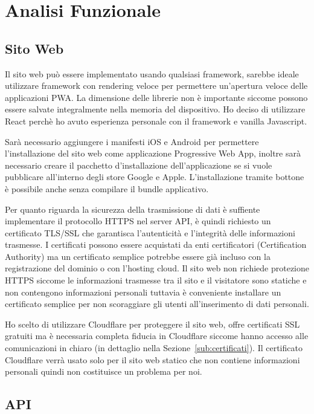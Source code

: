\section{Analisi Funzionale}%
\label{sec:analisi_funzionale}

\subsection{Sito Web}%
\label{sub:sito_web}

Il sito web pu\`o essere implementato usando qualsiasi framework, sarebbe ideale utilizzare framework con rendering veloce per permettere un'apertura veloce delle applicazioni PWA. La dimensione delle librerie non \`e importante siccome possono essere salvate integralmente nella memoria del dispositivo. Ho deciso di utilizzare React perch\`e ho avuto esperienza personale con il framework e vanilla Javascript.

Sar\`a necessario aggiungere i manifesti iOS e Android per permettere l'installazione del sito web come applicazione Progressive Web App, inoltre sar\`a necessario creare il pacchetto d'installazione dell'applicazione se si vuole pubblicare all'interno degli store Google e Apple. L'installazione tramite bottone \`e possibile anche senza compilare il bundle applicativo.

Per quanto riguarda la sicurezza della trasmissione di dati \`e suffiente implementare il protocollo HTTPS nel server API, \`e quindi richiesto un certificato TLS/SSL che garantisca l'autenticit\`a e l'integrit\`a delle informazioni trasmesse. I certificati possono essere acquistati da enti certificatori (Certification Authority) ma un certificato semplice potrebbe essere gi\`a incluso con la registrazione del dominio o con l'hosting cloud. Il sito web non richiede protezione HTTPS siccome le informazioni trasmesse tra il sito e il visitatore sono statiche e non contengono informazioni personali tuttavia \`e conveniente installare un certificato semplice per non scoraggiare gli utenti all'inserimento di dati personali.

Ho scelto di utilizzare Cloudflare per proteggere il sito web, offre certificati SSL gratuiti ma \`e necessaria completa fiducia in Cloudflare siccome hanno accesso alle comunicazioni in chiaro (in dettaglio nella Sezione~\ref{sub:certificati}). Il certificato Cloudflare verr\`a usato solo per il sito web statico che non contiene informazioni personali quindi non costituisce un problema per noi.

\subsection{API}%
\label{sub:api}

